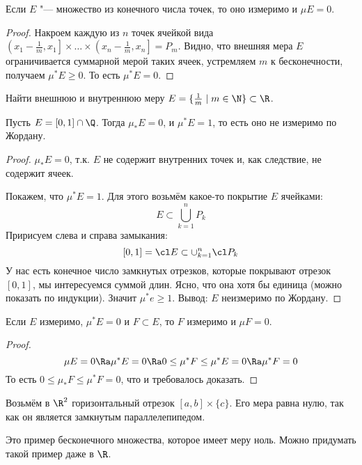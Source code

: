 \begin{exmp}
	Если $E$ "--- множество из конечного числа точек, то оно измеримо и $\mu E = 0$.
\end{exmp}
\begin{proof}
	Накроем каждую из $n$ точек ячейкой вида $\left(x_1 - \frac 1m, x_1\right] \times\dots\times \left(x_n - \frac 1m, x_n\right] = P_m$.
	Видно, что внешняя мера $E$ ограничивается суммарной мерой таких ячеек, устремляем $m$ к бесконечности, получаем $\mu^* E \ge 0$.
	То есть $\mu^* E = 0$.
\end{proof}

\begin{Exercise}
	Найти внешнюю и внутреннюю меру $E = \{ \frac 1 m \mid m \in \N \} \subset \R$.
\end{Exercise}

\begin{exmp}
	Пусть $E = [0, 1] \cap \Q$.
	Тогда $\mu_* E = 0$, и $\mu^* E = 1$, то есть оно не измеримо по Жордану.
\end{exmp}
\begin{proof}
	$\mu_* E = 0$, т.к. $E$ не содержит внутренних точек и, как следствие, не содержит ячеек.

	Покажем, что $\mu^* E = 1$.
	Для этого возьмём какое-то покрытие $E$ ячейками:
	\[ E \subset \bigcup_{k=1}^n P_k \]
	Пририсуем слева и справа замыкания:
	\[ [0,1] = \cl E \subset \cup_{k=1}^n \cl P_k \]
	У нас есть конечное число замкнутых отрезков, которые покрывают отрезок $[0,1]$, мы интересуемся
	суммой длин.
	Ясно, что она хотя бы единица (можно показать по индукции).
	Значит $\mu^*e \ge 1$.
	Вывод: $E$ неизмеримо по Жордану.
\end{proof}

\begin{exmp}
	Если $E$ измеримо, $\mu^* E = 0$ и $F \subset E$, то $F$ измеримо и $\mu F = 0$.
\end{exmp}
\begin{proof}
	\[ \mu E = 0 \Ra \mu^* E = 0 \Ra 0 \le \mu^* F \le \mu^* E = 0 \Ra \mu^*F = 0 \]
	То есть $0 \le \mu_* F \le \mu^* F = 0$, что и требовалось доказать.
\end{proof}

\begin{exmp}
	Возьмём в $\R^2$ горизонтальный отрезок $[a,b] \times \{c\}$.
	Его мера равна нулю, так как он является замкнутым параллелепипедом.
\end{exmp}
\begin{Rem}
	Это пример бесконечного множества, которое имеет меру ноль.
	Можно придумать такой пример даже в $\R$.
\end{Rem}

